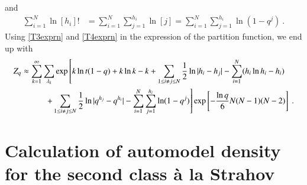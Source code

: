 \documentclass[3p,12pt]{elsarticle}
\numberwithin{equation}{section}
\begin{document}
and
\begin{equation}
\label{T4exprn}
\begin{aligned}
\sum_{i=1}^N \ln [h_i]!&=\sum_{i=1}^{N}\sum_{j=1}^{h_i} \ln [j]=\sum_{i=1}^{N}\sum_{j=1}^{h_i} \ln (1-q^j)\ .
\end{aligned}
\end{equation}
Using \eqref{T3exprn} and \eqref{T4exprn} in the expression of the partition function, we end up with
\begin{equation}
\begin{aligned}
Z_q &\approx \sum_{k=1}^{\infty}\sum_{\lambda_k} \exp \left[k\ln t(1-q) +k\ln k -k +\sum_{1 \leq i\neq j\leq N} \frac{1}{2} \ln |h_i-h_j|-\sum_{i=1}^N(h_i \ln h_i -h_i)\right.\\
&\hspace*{1cm}\left. +\sum_{1 \leq i\neq j\leq N}  \frac{1}{2}\ln |q^{h_j}-q^{h_i}| -\sum_{i=1}^N \sum_{j=1}^{h_i} \ln (1-q^j)\right]\exp\left[-\frac{\ln q}{6}N(N-1)(N-2)\right]\ .
\end{aligned}
\end{equation}


\section{Calculation of automodel density for the second class \`{a} la Strahov}\label{app:strahov}
\end{document}
